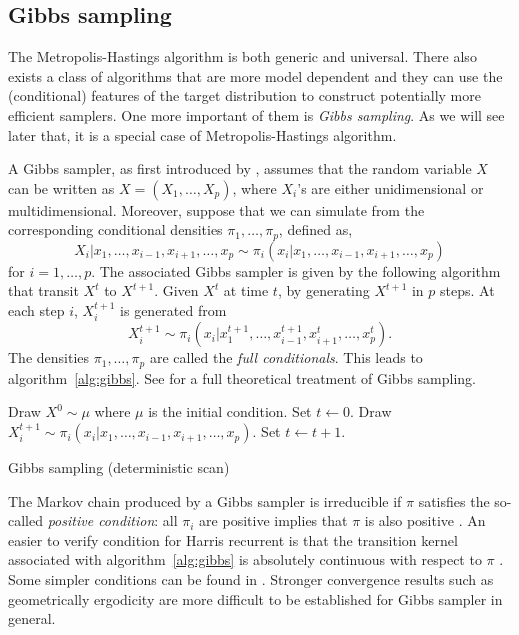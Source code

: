 \subsection{Gibbs sampling}
\label{sub:Gibbs sampling}

The Metropolis-Hastings algorithm is both generic and universal. There also
exists a class of \mcmc algorithms that are more model dependent and they can
use the (conditional) features of the target distribution to construct
potentially more efficient samplers. One more important of them is \emph{Gibbs
  sampling}. As we will see later that, it is a special case of
Metropolis-Hastings algorithm.

A Gibbs sampler, as first introduced by \cite{Geman:1993bp}, assumes that the
random variable $X$ can be written as $X = (X_1,\dots,X_p)$, where $X_i$'s are
either unidimensional or multidimensional. Moreover, suppose that we can
simulate from the corresponding conditional densities $\pi_1,\dots,\pi_p$,
defined as,
\begin{equation}
  X_i|x_1,\dots,x_{i-1},x_{i+1},\dots,x_p
  \sim \pi_i(x_i|x_1,\dots,x_{i-1},x_{i+1},\dots,x_p)
\end{equation}
for $i = 1,\dots,p$. The associated Gibbs sampler is given by the following
algorithm that transit $X^t$ to $X^{t+1}$. Given $X^t$ at time $t$, by
generating $X^{t+1}$ in $p$ steps. At each step $i$, $X_i^{t+1}$ is generated
from
\begin{equation}
  X_i^{t+1} \sim
  \pi_i(x_i|x_1^{t+1},\dots,x_{i-1}^{t+1},x_{i+1}^t,\dots,x_p^t).
\end{equation}
The densities $\pi_1,\dots,\pi_p$ are called the \emph{full conditionals}.
This leads to algorithm~\ref{alg:gibbs}. See \cite[][chap.~8
and~9]{Robert:2004tn} for a full theoretical treatment of Gibbs sampling.

\begin{algorithm}
\begin{algorithmic}
  \tophrule
  \STATE Draw $X^0\sim\mu$ where $\mu$ is the initial condition.
  \STATE Set $t\leftarrow0$.
  \REPEAT
      \STATE Draw
      $X_i^{t+1}\sim\pi_i(x_i|x_1,\dots,x_{i-1},x_{i+1},\dots,x_p)$.
    \ENDFOR
    \STATE Set $t\leftarrow t+1$.
  \bottomhrule
\end{algorithmic}
\caption{Gibbs sampling (deterministic scan)}
\label{alg:gibbs}
\end{algorithm}

The Markov chain produced by a Gibbs sampler is irreducible if $\pi$ satisfies
the so-called \emph{positive condition}: all $\pi_i$ are positive implies that
$\pi$ is also positive \cite[][Theorem~10.8]{Robert:2004tn}. An easier to
verify condition for Harris recurrent is that the transition kernel associated
with algorithm~\ref{alg:gibbs} is absolutely continuous with respect to $\pi$
\cite{Tierney:1994uk}. Some simpler conditions can be found in
\cite{Hobert:1997vx}. Stronger convergence results such as geometrically
ergodicity are more difficult to be established for Gibbs sampler in general.

